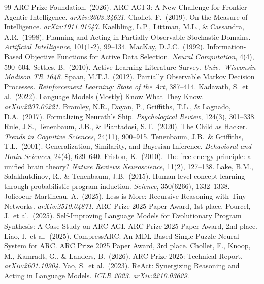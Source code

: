 \documentclass[11pt]{article}
\begin{document}
\begin{thebibliography}{99}
 ARC Prize Foundation. (2026). ARC-AGI-3: A New Challenge for Frontier Agentic Intelligence. \textit{arXiv:2603.24621}.
 Chollet, F.\ (2019). On the Measure of Intelligence. \textit{arXiv:1911.01547}.
 Kaelbling, L.P., Littman, M.L., \& Cassandra, A.R.\ (1998). Planning and Acting in Partially Observable Stochastic Domains. \textit{Artificial Intelligence}, 101(1-2), 99--134.
 MacKay, D.J.C.\ (1992). Information-Based Objective Functions for Active Data Selection. \textit{Neural Computation}, 4(4), 590--604.
 Settles, B.\ (2010). Active Learning Literature Survey. \textit{Univ.\ Wisconsin--Madison TR 1648}.
 Spaan, M.T.J.\ (2012). Partially Observable Markov Decision Processes. \textit{Reinforcement Learning: State of the Art}, 387--414.
 Kadavath, S.\ et al.\ (2022). Language Models (Mostly) Know What They Know. \textit{arXiv:2207.05221}.
 Bramley, N.R., Dayan, P., Griffiths, T.L., \& Lagnado, D.A.\ (2017). Formalizing Neurath's Ship. \textit{Psychological Review}, 124(3), 301--338.
 Rule, J.S., Tenenbaum, J.B., \& Piantadosi, S.T.\ (2020). The Child as Hacker. \textit{Trends in Cognitive Sciences}, 24(11), 900--915.
 Tenenbaum, J.B.\ \& Griffiths, T.L.\ (2001). Generalization, Similarity, and Bayesian Inference. \textit{Behavioral and Brain Sciences}, 24(4), 629--640.
 Friston, K.\ (2010). The free-energy principle: a unified brain theory? \textit{Nature Reviews Neuroscience}, 11(2), 127--138.
 Lake, B.M., Salakhutdinov, R., \& Tenenbaum, J.B.\ (2015). Human-level concept learning through probabilistic program induction. \textit{Science}, 350(6266), 1332--1338.
 Jolicoeur-Martineau, A.\ (2025). Less is More: Recursive Reasoning with Tiny Networks. \textit{arXiv:2510.04871}. ARC Prize 2025 Paper Award, 1st place.
 Pourcel, J.\ et al.\ (2025). Self-Improving Language Models for Evolutionary Program Synthesis: A Case Study on ARC-AGI. ARC Prize 2025 Paper Award, 2nd place.
 Liao, I.\ et al.\ (2025). CompressARC: An MDL-Based Single-Puzzle Neural System for ARC. ARC Prize 2025 Paper Award, 3rd place.
 Chollet, F., Knoop, M., Kamradt, G., \& Landers, B.\ (2026). ARC Prize 2025: Technical Report. \textit{arXiv:2601.10904}.
 Yao, S.\ et al.\ (2023). ReAct: Synergizing Reasoning and Acting in Language Models. \textit{ICLR 2023}. \textit{arXiv:2210.03629}.

\end{thebibliography}
\end{document}
